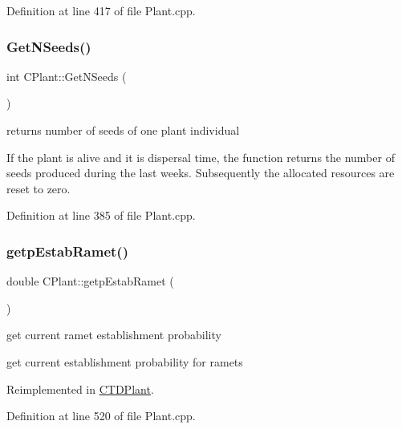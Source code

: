 Definition at line 417 of file Plant.\+cpp.

\mbox{\label{class_c_plant_a0e6da4d0343dc1cceae34118ca8e2a3f}} 
\subsubsection{\texorpdfstring{GetNSeeds()}{GetNSeeds()}}
{\footnotesize\ttfamily int C\+Plant\+::\+Get\+N\+Seeds (\begin{DoxyParamCaption}{ }\end{DoxyParamCaption})\hspace{0.3cm}{\ttfamily [virtual]}}



returns number of seeds of one plant individual 

If the plant is alive and it is dispersal time, the function returns the number of seeds produced during the last weeks. Subsequently the allocated resources are reset to zero. 

Definition at line 385 of file Plant.\+cpp.

\mbox{\label{class_c_plant_a5ab0a36c3e58898c7c750db485eca653}} 
\subsubsection{\texorpdfstring{getpEstabRamet()}{getpEstabRamet()}}
{\footnotesize\ttfamily double C\+Plant\+::getp\+Estab\+Ramet (\begin{DoxyParamCaption}{ }\end{DoxyParamCaption})\hspace{0.3cm}{\ttfamily [virtual]}}



get current ramet establishment probability 

get current establishment probability for ramets 

Reimplemented in \mbox{\hyperlink{class_c_t_d_plant_a19bab3a7643e23e1bdbf1f3b9a5fdf8b}{C\+T\+D\+Plant}}.



Definition at line 520 of file Plant.\+cpp.

\mbox{\label{class_c_plant_a475e1b0149b52abca2a699f20960c552}} 
